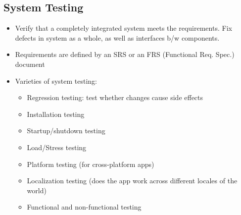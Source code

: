 \documentclass{article}
\begin{document}
\subsection{System Testing}
\begin{itemize}
    \item Verify that a completely integrated system meets the requirements. Fix defects in system as a whole, as well as interfaces b/w components.
    
    \item Requirements are defined by an SRS or an FRS (Functional Req. Spec.) document 
    
    \item Varieties of system testing:
    \begin{itemize}
        \item Regression testing: test whether changes cause side effects
        
        \item Installation testing
        
        \item Startup/shutdown testing
        
        \item Load/Stress testing
        
        \item Platform testing (for cross-platform apps)
        
        \item Localization testing (does the app work across different locales of the world)
        
        \item Functional and non-functional testing 
    \end{itemize}
\end{itemize}
\end{document}
